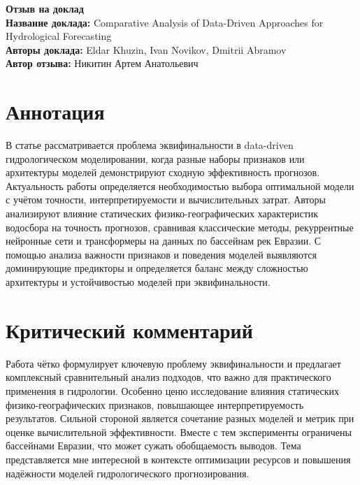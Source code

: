 \documentclass[11pt]{article}
\begin{document}
\begin{center}
    {\Large \textbf{Отзыв на доклад}}\\[1em]
    {\large \textbf{Название доклада:} Comparative Analysis of Data-Driven Approaches for Hydrological Forecasting}\\[0.5em]
    {\large \textbf{Авторы доклада:} Eldar Khuzin, Ivan Novikov, Dmitrii Abramov}\\[0.5em]
    {\large \textbf{Автор отзыва:} Никитин Артем Анатольевич}\\[2em]
\end{center}

\section*{Аннотация}
В статье рассматривается проблема эквифинальности в data-driven гидрологическом моделировании, когда разные наборы признаков 
или архитектуры моделей демонстрируют сходную эффективность прогнозов. Актуальность работы определяется необходимостью 
выбора оптимальной модели с учётом точности, интерпретируемости и вычислительных затрат. Авторы анализируют влияние 
статических физико-географических характеристик водосбора на точность прогнозов, сравнивая классические методы, рекуррентные 
нейронные сети и трансформеры на данных по бассейнам рек Евразии. С помощью анализа важности признаков и поведения моделей 
выявляются доминирующие предикторы и определяется баланс между сложностью архитектуры и устойчивостью моделей при 
эквифинальности.

\section*{Критический комментарий}
Работа чётко формулирует ключевую проблему эквифинальности и предлагает комплексный сравнительный анализ подходов, что важно 
для практического применения в гидрологии. Особенно ценю исследование влияния статических физико-географических признаков, 
повышающее интерпретируемость результатов. Сильной стороной является сочетание разных моделей и метрик при оценке 
вычислительной эффективности. Вместе с тем эксперименты ограничены бассейнами Евразии, что может сужать обобщаемость 
выводов. Тема представляется мне интересной в контексте оптимизации ресурсов и повышения надёжности моделей гидрологического 
прогнозирования.
\end{document}
